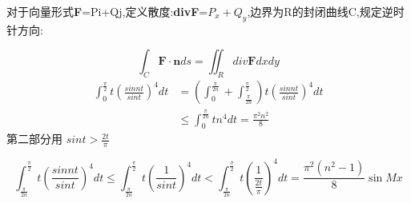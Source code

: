 \documentclass{ctexart}
\begin{document}
   \begin{tcolorbox}[title = {格林公式的散度形式},colbacktitle=green!35!black,colback=green!1,arc = 2mm, outer arc = 2mm,fonttitle = \itshape, fontupper = \itshape, fontlower = \itshape] 
	对于向量形式\textbf{F}=Pi+Qj,定义散度:\textbf{divF}=$P_{x}+Q_{y}$,边界为R的封闭曲线C,规定逆时针方向:
	
	$$\int_{C} \textbf{F} \cdot \textbf{n} ds =\iint_{R} div \textbf{F}dxdy  $$ 
	\begin{align*}
	\int_{0}^{\frac{\pi}{2}}t\left(\frac{sinnt}{sint} \right)^{4}dt &= \left( \int_{0}^{\frac{\pi}{2n}}+\int_{\frac{\pi}{2n}}^{\frac{\pi}{2}}\right)t\left(\frac{sinnt}{sint} \right)^{4}dt\\
	  & \le \int_{0}^{\frac{\pi}{2n}}tn^{4}dt=\frac{\pi^{2}n^{2}}{8}
	\end{align*}
  第二部分用 $sint > \displaystyle{\frac{2t}{\pi}}$
  
  
  $$\int_{\frac{\pi}{2n}}^{\frac{\pi}{2}}t\left(\frac{sinnt}{sint} \right)^{4}dt \le \int_{\frac{\pi}{2n}}^{\frac{\pi}{2}}t \left(\frac{1}{sint} \right)^{4}dt <\int_{\frac{\pi}{2n}}^{\frac{\pi}{2}}t \left(\frac{1}{\frac{2t}{\pi}} \right)^{4}dt = \frac{\pi^{2}(n^{2}-1)}{8}  \sin Mx$$
        
	 
	 

\end{tcolorbox}
\end{document}
